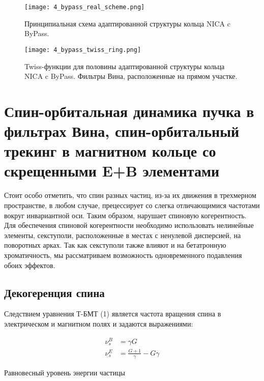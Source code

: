 \begin{figure}[!h]
  \centering
   \texttt{[image: 4\_bypass\_real\_scheme.png]}
   \caption{Принципиальная схема адаптированной структуры кольца NICA c ByPass.}
   \label{fig:4_bypass_real_scheme}
\end{figure}

\begin{figure}[!h]
  \centering
   \texttt{[image: 4\_bypass\_twiss\_ring.png]}
   \caption{Twiss-функции для половины адаптированной структуры кольца NICA c ByPass. Фильтры Вина, расположенные на прямом участке.}
   \label{fig:4_bypass_twiss_ring}
\end{figure}

\newpage
\section{Спин-орбитальная динамика пучка в фильтрах Вина, спин-орбитальный трекинг в магнитном кольце со скрещенными E+B элементами} \label{sec:EDM/Wien_filter_tracking}

\par Стоит особо отметить, что спин разных частиц, из-за их движения в трехмерном пространстве, в любом случае, прецессирует со слегка отличающимися частотами вокруг инвариантной оси. Таким образом, нарушает спиновую когерентность. Для обеспечения спиновой когерентности необходимо использовать нелинейные элементы, секступоли, расположенные в местах с ненулевой дисперсией, на поворотных арках. Так как секступоли также влияют и на бетатронную хроматичность, мы рассматриваем возможность одновременного подавления обоих эффектов.

\subsection{Декогеренция спина}\label{sec:EDM/Wien_filter_tracking/decoherence}

Следствием уравнения Т-БМТ (1) является частота вращения спина в электрическом и магнитном полях и задаются выражениями:

\begin{equation}
\begin{aligned}
\nu_{s}^{B} &= \gamma G \\
\nu_{s}^{E} &= \frac{G+1}{\gamma}-G \gamma
\end{aligned}
\end{equation}

\par Равновесный уровень энергии частицы

